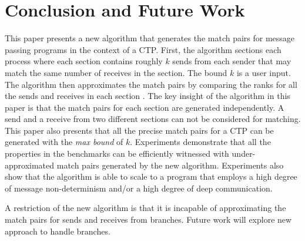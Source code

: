 \section{Conclusion and Future Work}
This paper presents a new algorithm that generates the match pairs for message passing programs in the context of a CTP.
First, the algorithm sections each process where each section contains roughly $k$ sends from each sender that may match the same number of receives in the section. The bound $k$ is a user input.
The algorithm then approximates the match pairs by comparing the ranks for all the sends and receives in each section \cite{DBLP:conf/kbse/HuangMM13}. The key insight of the algorithm in this paper is that the match pairs for each section are generated independently. 
A send and a receive from two different sections can not be considered for matching. 
This paper also presents that all the precise match pairs for a CTP can be generated with the \textit{max bound} of $k$. Experiments demonstrate that all the properties in the benchmarks can be efficiently witnessed with under-approximated match pairs generated by the new algorithm. Experiments also show that the algorithm is able to scale to a program that employs a high degree of message non-determinism and/or a high degree of deep communication.

A restriction of the new algorithm is that it is incapable of approximating the match pairs for sends and receives from branches. Future work will explore new approach to handle branches.


